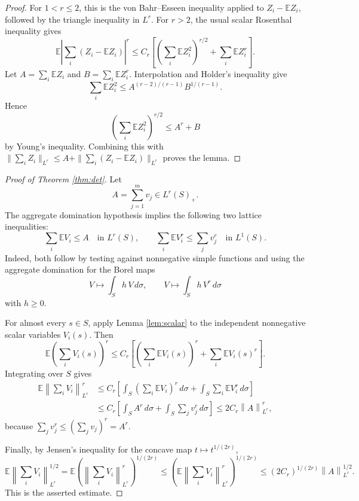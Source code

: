 \documentclass[11pt]{article}
\newcommand{\E}{\mathbb E}
\newcommand{\norm}[1]{\left\lVert #1\right\rVert}
\begin{document}
\begin{proof}
For \(1<r\le2\), this is the von Bahr--Esseen inequality applied to
\(Z_i-\E Z_i\), followed by the triangle inequality in \(L^r\).  For \(r>2\),
the usual scalar Rosenthal inequality gives
\[
  \E\left|\sum_i(Z_i-\E Z_i)\right|^r
  \le
  C_r\left[
    \left(\sum_i\E Z_i^2\right)^{r/2}
    +
    \sum_i\E Z_i^r
  \right].
\]
Let \(A=\sum_i\E Z_i\) and \(B=\sum_i\E Z_i^r\).  Interpolation and Holder's
inequality give
\[
  \sum_i\E Z_i^2
  \le
  A^{(r-2)/(r-1)}B^{1/(r-1)}.
\]
Hence
\[
  \left(\sum_i\E Z_i^2\right)^{r/2}\le A^r+B
\]
by Young's inequality.  Combining this with
\(\|\sum_iZ_i\|_{L^r}\le A+\|\sum_i(Z_i-\E Z_i)\|_{L^r}\) proves the lemma.
\end{proof}

\begin{proof}[Proof of Theorem \ref{thm:det}]
Let
\[
  A=\sum_{j=1}^m v_j\in L^r(S)_+.
\]
The aggregate domination hypothesis implies the following two lattice
inequalities:
\[
  \sum_i \E V_i \le A
  \quad\text{in }L^r(S),
  \qquad
  \sum_i \E V_i^r \le \sum_j v_j^r
  \quad\text{in }L^1(S).
\]
Indeed, both follow by testing against nonnegative simple functions and using
the aggregate domination for the Borel maps
\[
  V\mapsto \int_S h\,V\,d\sigma,
  \qquad
  V\mapsto \int_S h\,V^r\,d\sigma
\]
with \(h\ge0\).

For almost every \(s\in S\), apply Lemma \ref{lem:scalar} to the independent
nonnegative scalar variables \(V_i(s)\).  Then
\[
  \E\left(\sum_i V_i(s)\right)^r
  \le
  C_r\left[
      \left(\sum_i \E V_i(s)\right)^r
      +
      \sum_i \E V_i(s)^r
    \right].
\]
Integrating over \(S\) gives
\[
\begin{aligned}
  \E\norm{\sum_i V_i}_{L^r}^r
  &\le
  C_r\left[
      \int_S\left(\sum_i \E V_i\right)^r\,d\sigma
      +
      \int_S \sum_i \E V_i^r\,d\sigma
    \right]  \\
  &\le
  C_r\left[
      \int_S A^r\,d\sigma
      +
      \int_S \sum_j v_j^r\,d\sigma
    \right]
  \le
  2C_r\norm{A}_{L^r}^r,
\end{aligned}
\]
because \(\sum_j v_j^r\le(\sum_j v_j)^r=A^r\).

Finally, by Jensen's inequality for the concave map \(t\mapsto t^{1/(2r)}\),
\[
  \E\norm{\sum_i V_i}_{L^r}^{1/2}
  =
  \E\left(\norm{\sum_i V_i}_{L^r}^{r}\right)^{1/(2r)}
  \le
  \left(\E\norm{\sum_i V_i}_{L^r}^{r}\right)^{1/(2r)}
  \le
  (2C_r)^{1/(2r)}\norm{A}_{L^r}^{1/2}.
\]
This is the asserted estimate.
\end{proof}
\end{document}
